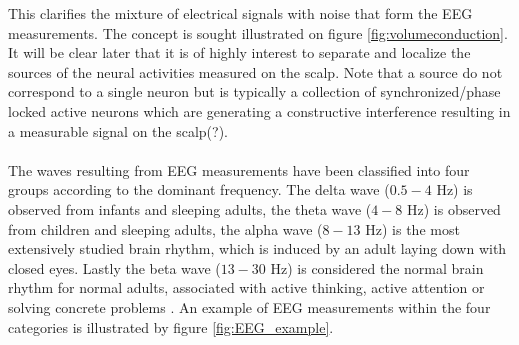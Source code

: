 This clarifies the mixture of electrical signals with noise that form the EEG measurements. The concept is sought illustrated on figure \ref{fig:volumeconduction}. \\
It will be clear later that it is of highly interest to separate and localize the sources of the neural activities measured on the scalp. Note that a source do not correspond to a single neuron but is typically a collection of synchronized/phase locked active neurons which are generating a constructive interference resulting in a measurable signal on the scalp(?).     
\\
\\
The waves resulting from EEG measurements have been classified into four groups according to the dominant frequency. The delta wave ($0.5-4$ Hz) is observed from infants and sleeping adults, the theta wave ($4-8$ Hz) is observed from children and sleeping adults, the alpha wave ($8-13$ Hz) is the most extensively studied brain rhythm, which is induced by an adult laying down with closed eyes. Lastly the beta wave ($13-30$ Hz) is considered the normal brain rhythm for normal adults, associated with active thinking, active attention or solving concrete problems \cite[p. 11]{EEGsignalprocessing}. An example of EEG measurements within the four categories is illustrated by figure \ref{fig:EEG_example}.        
